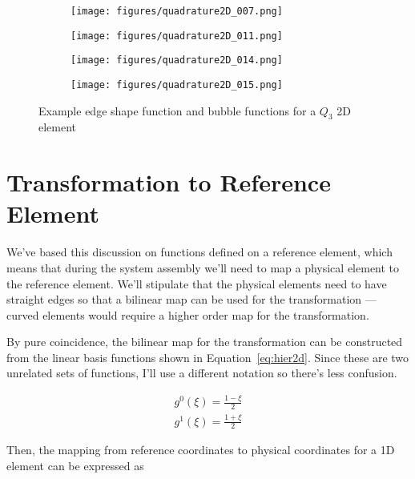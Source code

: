 \documentclass[11pt]{style/memo}
\begin{document}
\begin{figure}[h]
    \centering
    \begin{subfigure}[b]{0.49\textwidth}
        \centering
        \texttt{[image: figures/quadrature2D\_007.png]}
    \end{subfigure}
    \hfill
    \begin{subfigure}[b]{0.49\textwidth}
        \centering
        \texttt{[image: figures/quadrature2D\_011.png]}
    \end{subfigure}

    \begin{subfigure}[b]{0.49\textwidth}
        \centering
        \texttt{[image: figures/quadrature2D\_014.png]}
    \end{subfigure}
    \hfill
    \begin{subfigure}[b]{0.49\textwidth}
        \centering
        \texttt{[image: figures/quadrature2D\_015.png]}
    \end{subfigure}
    \caption{Example edge shape function and bubble functions for a $Q_3$ 2D element}
    \label{fig:hier2d_q3}
\end{figure}

\section{Transformation to Reference Element}
We've based this discussion on functions defined on a reference element, which means
that during the system assembly we'll need to map a physical element to the
reference element. We'll stipulate that the physical elements need to have straight
edges so that a bilinear map can be used for the transformation --- curved elements
would require a higher order map for the transformation.

By pure coincidence, the bilinear map for the transformation can be constructed from the
linear basis functions shown in Equation~\ref{eq:hier2d}. Since these are two unrelated
sets of functions, I'll use a different notation so there's less confusion.

\begin{eqnarray*}
    g^0(\xi) = \frac{1 - \xi}{2} \\
    g^1(\xi) = \frac{1 + \xi}{2}
\end{eqnarray*}

Then, the mapping from reference coordinates to physical coordinates for a 1D element
can be expressed as
\end{document}
